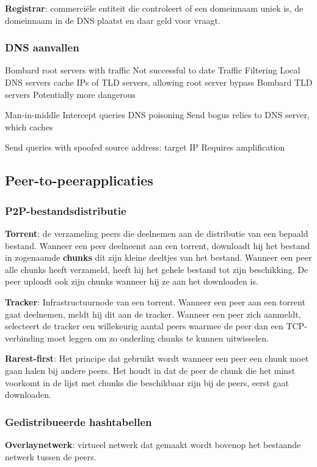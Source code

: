 
\textbf{Registrar}: commerciële entiteit die controleert of een domeinnaam uniek is, de domeinnaam in de DNS plaatst en daar geld voor vraagt.



\subsubsection{DNS aanvallen}


\bi
\itf Bombard root servers with traffic
    \bi
    \itf Not successful to date
    \itf Traffic Filtering
    \itf Local DNS servers cache IPs of TLD servers, allowing root server bypass
    \ei
\itf Bombard TLD servers
    \bi
\itf Potentially more dangerous
    \ei
\ei


\bi
\itf Man-in-middle
    \bi
    \itf Intercept queries
    \ei
\itf DNS poisoning
    \bi
    \itf Send bogus relies to DNS server, which caches
    \ei
\ei


\bi
\itf Send queries with spoofed source address: target IP
\itf Requires amplification
\ei

\subsection{Peer-to-peerapplicaties}

\subsubsection{P2P-bestandsdistributie}

\noindent \textbf{Torrent}: de verzameling peers die deelnemen aan de distributie van een bepaald bestand. Wanneer een peer deelneemt aan een torrent, downloadt hij het bestand in zogenaamde \textbf{chunks} dit zijn kleine deeltjes van het bestand. Wanneer een peer alle chunks heeft verzameld, heeft hij het gehele bestand tot zijn beschikking. De peer uploadt ook zijn chunks wanneer hij ze aan het downloaden is.

\noindent \textbf{Tracker}: Infrastructuurnode van een torrent. Wanneer een peer aan een torrent gaat deelnemen, meldt hij dit aan de tracker. Wanneer een peer zich aanmeldt, selecteert de tracker een willekeurig aantal peers waarmee de peer dan een TCP-verbinding moet leggen om zo onderling chunks te kunnen uitwisselen.

\noindent \textbf{Rarest-first}: Het principe dat gebruikt wordt wanneer een peer een chunk moet gaan halen bij andere peers. Het houdt in dat de peer de chunk die het minst voorkomt in de lijst met chunks die beschikbaar zijn bij de peers, eerst gaat downloaden.

\subsubsection{Gedistribueerde hashtabellen}

\textbf{Overlaynetwerk}: virtueel netwerk dat gemaakt wordt bovenop het bestaande netwerk tussen de peers.